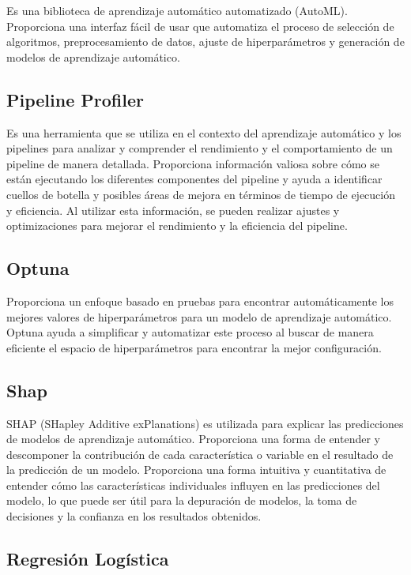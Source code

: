 Es una biblioteca de aprendizaje automático automatizado (AutoML). Proporciona una interfaz fácil de usar que automatiza el proceso de selección de algoritmos, preprocesamiento de datos, ajuste de hiperparámetros y generación de modelos de aprendizaje automático.

\subsection{Pipeline Profiler}

Es una herramienta que se utiliza en el contexto del aprendizaje automático y los pipelines para analizar y comprender el rendimiento y el comportamiento de un pipeline de manera detallada. Proporciona información valiosa sobre cómo se están ejecutando los diferentes componentes del pipeline y ayuda a identificar cuellos de botella y posibles áreas de mejora en términos de tiempo de ejecución y eficiencia. Al utilizar esta información, se pueden realizar ajustes y optimizaciones para mejorar el rendimiento y la eficiencia del pipeline.

\subsection{Optuna}

Proporciona un enfoque basado en pruebas para encontrar automáticamente los mejores valores de hiperparámetros para un modelo de aprendizaje automático. Optuna ayuda a simplificar y automatizar este proceso al buscar de manera eficiente el espacio de hiperparámetros para encontrar la mejor configuración.

\subsection{Shap}

SHAP (SHapley Additive exPlanations) es utilizada para explicar las predicciones de modelos de aprendizaje automático. Proporciona una forma de entender y descomponer la contribución de cada característica o variable en el resultado de la predicción de un modelo. Proporciona una forma intuitiva y cuantitativa de entender cómo las características individuales influyen en las predicciones del modelo, lo que puede ser útil para la depuración de modelos, la toma de decisiones y la confianza en los resultados obtenidos.

\subsection{Regresión Logística}

